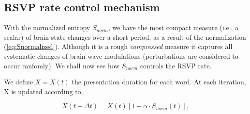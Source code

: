 


\subsection{RSVP rate control mechanism}
With the normalized entropy $S_{norm}$, we have the most compact measure (i.e., a scalar) of brain state changes over a short period, as a result of the normalization (\ref{eq:Snormalized}). Although it is a rough {\it compressed} measure it captures all systematic changes of brain wave modulations (perturbations are considered to occur ranfomly). We shall now see how $S_{norm}$ controls the RSVP rate. 

We define $X = X(t)$ the presentation duration for each word. At each iteration, X is updated according to,

\begin{equation}
X(t+\Delta t) = X(t) \left[1 + \alpha \cdot S_{norm}(t)\right],
\label{eq:RateChange}
\end{equation}

